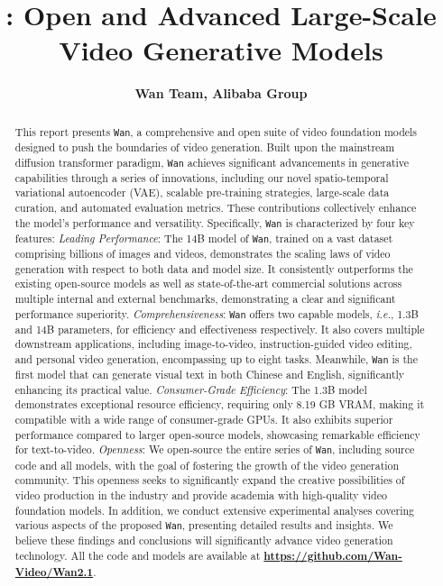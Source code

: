 \documentclass[UTF8]{article} %
\title{\method: Open and Advanced Large-Scale Video Generative Models}
\author{
\textbf{Wan Team, Alibaba Group}
}
\newcommand{\method}{\texttt{Wan}\xspace}
\begin{document}
\maketitle

\begin{abstract}
This report presents \method, a comprehensive and open suite of video foundation models designed to push the boundaries of video generation.
%
Built upon the mainstream diffusion transformer paradigm, \method achieves significant advancements in generative capabilities through a series of innovations, including our novel spatio-temporal variational autoencoder (VAE), scalable pre-training strategies, large-scale data curation, and automated evaluation metrics.
%
These contributions collectively enhance the model's performance and versatility.
%
Specifically, \method is characterized by four key features:
%
\emph{Leading Performance}: The 14B model of \method, trained on a vast dataset comprising billions of images and videos, demonstrates the scaling laws of video generation with respect to both data and model size.
%
It consistently outperforms the existing open-source models as well as state-of-the-art commercial solutions across multiple internal and external benchmarks, demonstrating a clear and significant performance superiority.
%
\emph{Comprehensiveness}: \method offers two capable models, \emph{i.e.}, 1.3B and 14B parameters, for efficiency and effectiveness respectively. 
%
It also covers multiple downstream applications, including image-to-video, instruction-guided video editing, and personal video generation, encompassing up to eight tasks.
%
Meanwhile, \method is the first model that can generate visual text in both Chinese and English, significantly enhancing its practical value.
%
\emph{Consumer-Grade Efficiency}: The 1.3B model demonstrates exceptional resource efficiency, requiring only 8.19 GB VRAM, making it compatible with a wide range of consumer-grade GPUs. It also exhibits superior performance compared to larger open-source models, showcasing remarkable efficiency for text-to-video.
%
\emph{Openness}: We open-source the entire series of \method, including source code and all models, with the goal of fostering the growth of the video generation community. 
%
This openness seeks to significantly expand the creative possibilities of video production in the industry and provide academia with high-quality video foundation models.
%
In addition, we conduct extensive experimental analyses covering various aspects of the proposed \method, presenting detailed results and insights.
%
We believe these findings and conclusions will significantly advance video generation technology. 
%
All the code and models are available at \textbf{\url{https://github.com/Wan-Video/Wan2.1}}.
%
\end{abstract}
\end{document}
